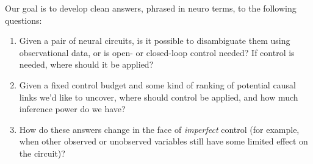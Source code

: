Our goal is to develop clean answers, phrased in neuro terms, to the following questions:
\begin{enumerate}
    \item Given a pair of neural circuits, is it possible to disambiguate them using observational data, or is open- or closed-loop control needed?  If control is needed, where should it be applied?
    \item Given a fixed control budget and some kind of ranking of potential causal links we'd like to uncover, where should control be applied, and how much inference power do we have?
    \item How do these answers change in the face of \emph{imperfect} control (for example, when other observed or unobserved variables still have some limited effect on the circuit)?
\end{enumerate}
